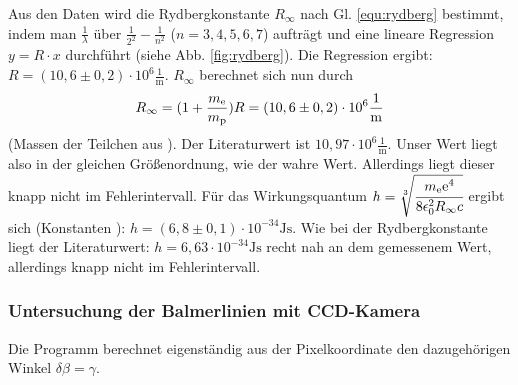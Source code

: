 Aus den Daten wird die Rydbergkonstante $R_\infty$ nach Gl. \ref{equ:rydberg} bestimmt, indem man $\frac{1}{\lambda}$ über $\frac{1}{2^2}-\frac{1}{n^2}$ ($n = 3,4,5,6,7$) aufträgt und eine lineare Regression $y = R \cdot x$ durchführt (siehe Abb. \ref{fig:rydberg}). Die Regression ergibt: $R = (10,6 \pm 0,2)\cdot 10^6\frac{1}{\si{\metre}}$. $R_\infty$ berechnet sich nun durch \[R_\infty = (1+\frac{m_\mathrm{e}}{m_\mathrm{p}}) R = (10,6 \pm 0,2)\cdot 10^6\frac{1}{\si{\metre}}\] (Massen der Teilchen aus \cite{wiki_konst}). Der Literaturwert ist $10,97 \cdot 10^6\frac{1}{\si{\metre}}$\cite{wiki_konst}. Unser Wert liegt also in der gleichen Größenordnung, wie der wahre Wert. Allerdings liegt dieser knapp nicht im Fehlerintervall. Für das Wirkungsquantum $h = \sqrt[3]{\cfrac{m_\mathrm{e}\mathrm{e}^4}{8\epsilon_0^2R_\infty c}}$ ergibt sich (Konstanten \cite{wiki_konst}): $h = (6,8 \pm 0,1) \cdot 10^{-34} \si{\joule \second}$. Wie bei der Rydbergkonstante liegt der Literaturwert: $h = 6,63 \cdot 10^{-34} \si{\joule \second}$ recht nah an dem gemessenem Wert, allerdings knapp nicht im Fehlerintervall.

\subsubsection{Untersuchung der Balmerlinien mit CCD-Kamera}
Die Programm berechnet eigenständig aus der Pixelkoordinate den dazugehörigen Winkel $\delta  \beta = \gamma$. 

